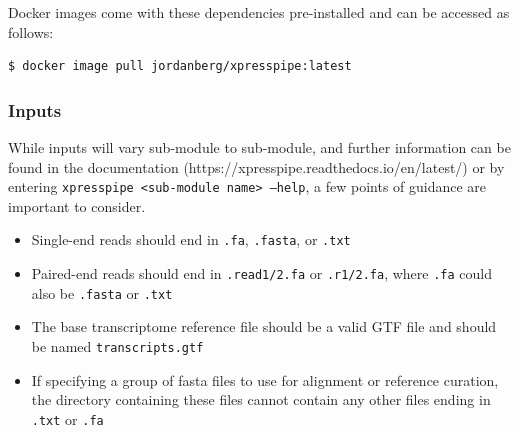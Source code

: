 \documentclass[11pt, a4paper, oneside]{article}
\begin{document}
Docker images come with these dependencies pre-installed and can be accessed as follows:

\begin{lstlisting}[language=bash, caption=Docker installation]
$ docker image pull jordanberg/xpresspipe:latest
\end{lstlisting}

\subsubsection{Inputs}
While inputs will vary sub-module to sub-module, and further information can be found in the documentation (https://xpresspipe.readthedocs.io/en/latest/) or by entering \texttt{xpresspipe \textless sub-module name\textgreater \ --help}, a few points of guidance are important to consider.

\begin{itemize}
\item Single-end reads should end in \texttt{.fa}, \texttt{.fasta}, or \texttt{.txt}
\item Paired-end reads should end in \texttt{.read1/2.fa} or \texttt{.r1/2.fa}, where \texttt{.fa} could also be \texttt{.fasta} or \texttt{.txt}
\item The base transcriptome reference file should be a valid GTF file and should be named \texttt{transcripts.gtf}
\item If specifying a group of fasta files to use for alignment or reference curation, the directory containing these files cannot contain any other files ending in \texttt{.txt} or \texttt{.fa}
\end{itemize}
\end{document}
